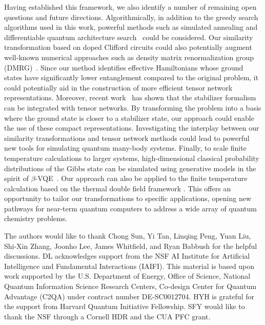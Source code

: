 \documentclass[a4paper,accepted=2024-07-10]{quantumarticle}
\begin{document}
Having established this framework, we also identify a number of remaining open questions and future directions. Algorithmically, in addition to the greedy search algorithms used in this work, powerful methods such as simulated annealing and differentiable quantum architecture search~\cite{Zhang_2022} could be considered. Our similarity transformation based on doped Clifford circuits could also potentially augment well-known numerical approaches such as density matrix renormalization group (DMRG)~\cite{Schollw_ck_2005}. Since our method identifies effective Hamiltonians whose ground states have significantly lower entanglement compared to the original problem, it could potentially aid in the construction of more efficient tensor network representations. Moreover, recent work~\cite{masotllima2024stabilizer} has shown that the stabilizer formalism can be integrated with tensor networks. By transforming the problem into a basis where the ground state is closer to a stabilizer state, our approach could enable the use of these compact representations. Investigating the interplay between our similarity transformations and tensor network methods could lead to powerful new tools for simulating quantum many-body systems. Finally, to scale finite temperature calculations to larger systems, high-dimensional classical probability distributions of the Gibbs state can be simulated using generative models in the spirit of $\beta$-VQE~\cite{Liu_2021}. Our approach can also be applied to the finite temperature calculation based on the thermal double field framework \cite{takahashi1996thermo,wu2019}. This offers an opportunity to tailor our transformations to specific applications, opening new pathways for near-term quantum computers to address a wide array of quantum chemistry problems.

\begin{acknowledgments}
The authors would like to thank Chong Sun, Yi Tan, Linqing Peng, Yuan Liu, Shi-Xin Zhang, Joonho Lee, James Whitfield, and Ryan Babbush for the helpful discussions. DL acknowledges support from the NSF AI Institute for Artificial Intelligence and Fundamental Interactions (IAIFI). This material is based upon work supported by the U.S. Department of Energy, Office of Science, National Quantum Information Science Research Centers, Co-design Center for Quantum Advantage (C2QA) under contract number DE-SC0012704. HYH is grateful for the support from Harvard Quantum Initiative Fellowship. SFY would like to thank the NSF through a Cornell HDR and the CUA PFC grant.
\end{acknowledgments}
\end{document}
